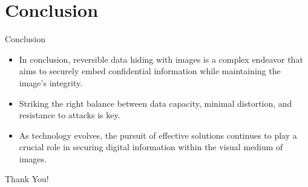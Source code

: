 \documentclass[10pt,xcolor=dvipsnames]{beamer}
\begin{document}
\section[Conclusion]{Conclusion}

\begin{frame}{Conclusion}
\begin{itemize}
    \item In conclusion, reversible data hiding with images is a complex endeavor that aims to securely embed confidential information while maintaining the image's integrity.

    \item  Striking the right balance between data capacity, minimal distortion, and resistance to attacks is key. 

    \item  As technology evolves, the pursuit of effective solutions continues to play a crucial role in securing digital information within the visual medium of images.
\end{itemize}
 

\end{frame}



\appendix

\begin{frame}[fragile]{} 
\begin{center}
    \textbf\Large{Thank You!}
\end{center}
\end{frame}
\end{document}
